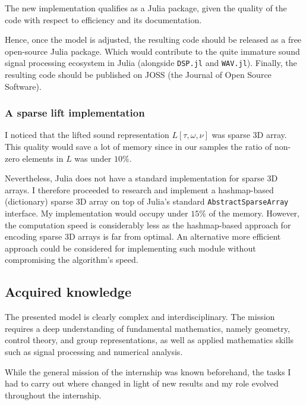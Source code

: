 \documentclass[
  american,
]{article}
\begin{document}
The new implementation qualifies as a Julia package,
given the quality of the code with respect to efficiency and its documentation.

Hence, once the model is adjusted, the resulting code should be released
as a free open-source Julia package.
Which would contribute to the quite immature sound signal processing ecosystem
in Julia (alongside \texttt{DSP.jl} and \texttt{WAV.jl}).
Finally, the resulting code should be published on JOSS (the Journal of Open Source Software).

\hypertarget{a-sparse-lift-implementation}{%
\subsubsection{A sparse lift implementation}\label{a-sparse-lift-implementation}}

I noticed that the lifted sound representation \(L[\tau,\omega,\nu]\) was sparse 3D array.
This quality would save a lot of memory since in our samples the ratio of non-zero
elements in \(L\) was under \(10\%\).

Nevertheless, Julia does not have a standard implementation for sparse 3D arrays.
I therefore proceeded to research and implement a hashmap-based (dictionary) sparse 3D array
on top of Julia's standard \texttt{AbstractSparseArray} interface.
My implementation would occupy under \(15\%\) of the memory.
However, the computation speed is considerably less as the hashmap-based approach
for encoding sparse 3D arrays is far from optimal.
An alternative more efficient approach could be considered for implementing such module
without compromising the algorithm's speed.

\hypertarget{acquired-knowledge}{%
\subsection{Acquired knowledge}\label{acquired-knowledge}}

The presented model is clearly complex and interdisciplinary.
The mission requires a deep understanding of fundamental mathematics,
namely geometry, control theory, and group representations,
as well as applied mathematics skills such as
signal processing and numerical analysis.

While the general mission of the internship was known beforehand,
the tasks I had to carry out where changed in light of new results
and my role evolved throughout the internship.
\end{document}
